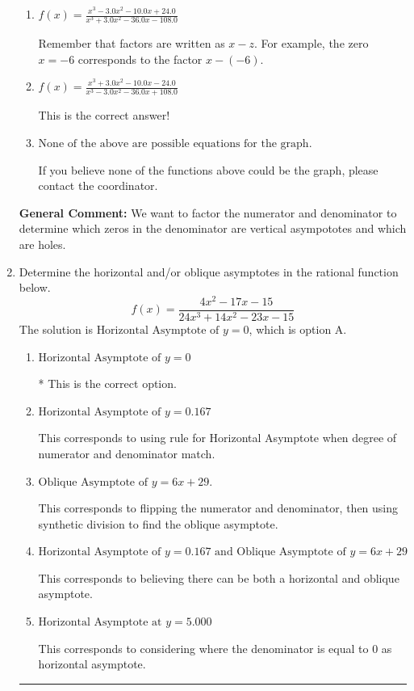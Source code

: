 \documentclass{extbook}[14pt]
\newcommand{\litem}[1]{\item #1

\rule{\textwidth}{0.4pt}}
\begin{document}
\begin{enumerate}
{\begin{enumerate}[label=\Alph*.]
You treated all of the zeros in the denominator as vertical asmptotes when some of them were holes and wrote factors as $x+z$.
\item \( f(x)=\frac{x^{3} -3.0 x^{2} -10.0 x + 24.0}{x^{3} +3.0 x^{2} -36.0 x -108.0} \)

Remember that factors are written as $x-z$. For example, the zero $x=-6$ corresponds to the factor $x-(-6)$.
\item \( f(x)=\frac{x^{3} +3.0 x^{2} -10.0 x -24.0}{x^{3} -3.0 x^{2} -36.0 x + 108.0} \)

This is the correct answer!
\item \( \text{None of the above are possible equations for the graph.} \)

If you believe none of the functions above could be the graph, please contact the coordinator.
\end{enumerate}

\textbf{General Comment:} We want to factor the numerator and denominator to determine which zeros in the denominator are vertical asympototes and which are holes.
}
\litem{
Determine the horizontal and/or oblique asymptotes in the rational function below.
\[ f(x) = \frac{4x^{2} -17 x -15}{24x^{3} +14 x^{2} -23 x -15} \]The solution is \( \text{Horizontal Asymptote of } y = 0 \), which is option A.\begin{enumerate}[label=\Alph*.]
\item \( \text{Horizontal Asymptote of } y = 0 \)

* This is the correct option.
\item \( \text{Horizontal Asymptote of } y = 0.167  \)

This corresponds to using rule for Horizontal Asymptote when degree of numerator and denominator match.
\item \( \text{Oblique Asymptote of } y = 6x + 29. \)

This corresponds to flipping the numerator and denominator, then using synthetic division to find the oblique asymptote.
\item \( \text{Horizontal Asymptote of } y = 0.167 \text{ and Oblique Asymptote of } y = 6x + 29 \)

This corresponds to believing there can be both a horizontal and oblique asymptote.
\item \( \text{Horizontal Asymptote at } y = 5.000 \)

This corresponds to considering where the denominator is equal to 0 as horizontal asymptote.
\end{enumerate}

}
\end{enumerate}
\end{document}
